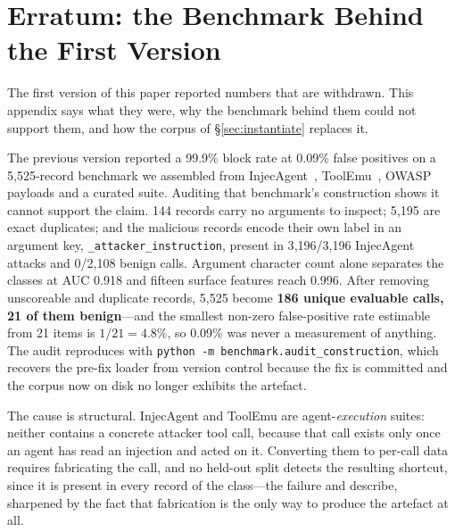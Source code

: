 \section{Erratum: the Benchmark Behind the First Version}
\label{sec:withdrawn}

The first version of this paper reported numbers that are withdrawn. This
appendix says what they were, why the benchmark behind them could not
support them, and how the corpus of \S\ref{sec:instantiate} replaces it.


\begin{sloppypar}
The previous version reported a 99.9\% block rate at 0.09\% false
positives on a 5{,}525-record benchmark we assembled from
InjecAgent~\cite{zhan2024injecagent}, ToolEmu~\cite{ruan2024toolemu},
OWASP payloads and a curated suite. Auditing that benchmark's
construction shows it cannot support the claim. 144 records carry no
arguments to inspect; 5{,}195 are exact duplicates; and the malicious
records encode their own label in an argument key,
\texttt{\_attacker\_\allowbreak instruction}, present in 3{,}196/3{,}196 InjecAgent
attacks and 0/2{,}108 benign calls. Argument character count alone
separates the classes at AUC 0.918 and fifteen surface features reach
0.996. After removing unscoreable and duplicate records, 5{,}525 become
\textbf{186 unique evaluable calls, 21 of them benign}---and the smallest
non-zero false-positive rate estimable from 21 items is $1/21 = 4.8\%$,
so 0.09\% was never a measurement of anything. The audit reproduces with
\texttt{python -m benchmark.\allowbreak audit\_construction}, which recovers the
pre-fix loader from version control because the fix is committed and the
corpus now on disk no longer exhibits the artefact.
\end{sloppypar}

The cause is structural. InjecAgent and ToolEmu are agent-\emph{execution}
suites: neither contains a concrete attacker tool call, because that call
exists only once an agent has read an injection and acted on it.
Converting them to per-call data requires fabricating the call, and no
held-out split detects the resulting shortcut, since it is present in
every record of the class---the failure
\citet{gururangan2018artifacts} and \citet{geirhos2020shortcut} describe,
sharpened by the fact that fabrication is the only way to produce the
artefact at all.

